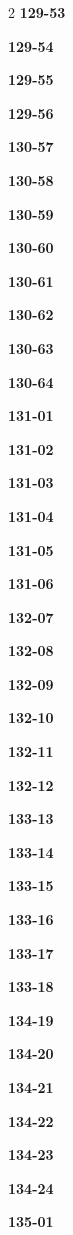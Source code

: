 \documentclass[10pt,a4paper]{article}
\begin{document}
\begin{multicols}{2}
\noindent\textbf{129-53}\ \par
\noindent\textbf{129-54}\ \par
\noindent\textbf{129-55}\ \par
\noindent\textbf{129-56}\ \par
\noindent\textbf{130-57}\ \par
\noindent\textbf{130-58}\ \par
\noindent\textbf{130-59}\ \par
\noindent\textbf{130-60}\ \par
\noindent\textbf{130-61}\ \par
\noindent\textbf{130-62}\ \par
\noindent\textbf{130-63}\ \par
\noindent\textbf{130-64}\ \par
\noindent\textbf{131-01}\ \par
\noindent\textbf{131-02}\ \par
\noindent\textbf{131-03}\ \par
\noindent\textbf{131-04}\ \par
\noindent\textbf{131-05}\ \par
\noindent\textbf{131-06}\ \par
\noindent\textbf{132-07}\ \par
\noindent\textbf{132-08}\ \par
\noindent\textbf{132-09}\ \par
\noindent\textbf{132-10}\ \par
\noindent\textbf{132-11}\ \par
\noindent\textbf{132-12}\ \par
\noindent\textbf{133-13}\ \par
\noindent\textbf{133-14}\ \par
\noindent\textbf{133-15}\ \par
\noindent\textbf{133-16}\ \par
\noindent\textbf{133-17}\ \par
\noindent\textbf{133-18}\ \par
\noindent\textbf{134-19}\ \par
\noindent\textbf{134-20}\ \par
\noindent\textbf{134-21}\ \par
\noindent\textbf{134-22}\ \par
\noindent\textbf{134-23}\ \par
\noindent\textbf{134-24}\ \par
\noindent\textbf{135-01}\ \par

\end{multicols}
\end{document}
